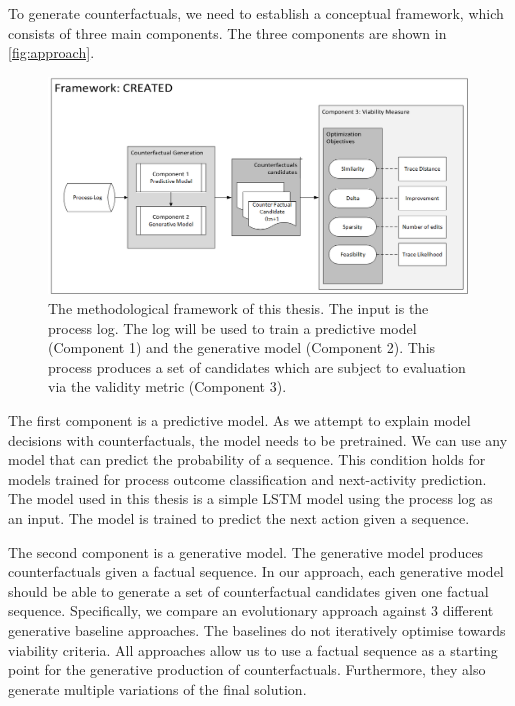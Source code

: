 \documentclass[./../../paper.tex]{subfiles}
\begin{document}
To generate counterfactuals, we need to establish a conceptual framework, which consists of three main components. The three components are shown in \autoref{fig:approach}. 

\begin{figure}[htb]
    \centering
    \includegraphics[width=0.99\textwidth]{figures/framework.png}
    \caption{The methodological framework of this thesis. The input is the process log. The log will be used to train a predictive model (Component 1) and the generative model (Component 2). This process produces a set of candidates which are subject to evaluation via the validity metric (Component 3).}
    \label{fig:approach}
\end{figure}

The first component is a predictive model. As we attempt to explain model decisions with counterfactuals, the model needs to be pretrained. We can use any model that can predict the probability of a sequence. This condition holds for models trained for process outcome classification and next-activity prediction. The model used in this thesis is a simple LSTM model using the process log as an input. The model is trained to predict the next action given a sequence. 

The second component is a generative model. The generative model produces counterfactuals given a factual sequence. In our approach, each generative model should be able to generate a set of counterfactual candidates given one factual sequence. Specifically, we compare an evolutionary approach against 3 different generative baseline approaches. The baselines do not iteratively optimise towards viability criteria. All approaches allow us to use a factual sequence as a starting point for the generative production of counterfactuals. Furthermore, they also generate multiple variations of the final solution. 
\end{document}
